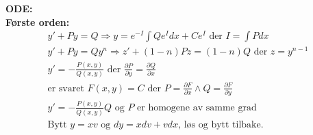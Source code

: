 \documentclass[8pt, A4paper, norsk]{extarticle}
\begin{document}
\begin{multicols*}{3}
{\Large \textbf{ODE:}} \\
\textbf{Første orden:}
		\begin{gather*}
y' + Py = Q \Rightarrow y = e^{- I} \int Q e^{I} dx + C e^{I} \text{ der } I = \int P dx \\
y' + Py = Qy^{n} \Rightarrow z' + (1 - n)Pz = (1 - n) Q \text{ der } z = y^{n - 1} \\
y' = - \frac{P(x, y)}{Q(x, y)} \text{ der } \frac{\partial P}{\partial y} = \frac{\partial Q}{\partial x} \\
\text{er svaret } F(x, y) = C \text{ der } P = \frac{\partial F}{\partial x} \wedge Q = \frac{\partial F}{\partial y} \\
y' = - \frac{P(x, y)}{Q(x, y)} \text{$Q$ og $P$ er homogene av samme grad} \\
\text{Bytt } y = xv \text{ og } dy = xdv + vdx \text{, løs og bytt tilbake.}
		\end{gather*}


\end{multicols*}
\end{document}
